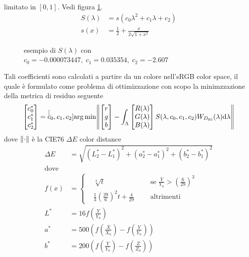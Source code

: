 limitato in $[0,1]$. Vedi figura \ref{chapter2:colorimetry:Slambda}.
\begin{align}\label{chapter2:colorimetry:rgb2spec}
	S(\lambda) &= s(c_0\lambda^2 + c_1\lambda + c_2)\\
	s(x) &= \frac{1}{2} + \frac{x}{2\sqrt{1+x^2}}
\end{align}
\begin{figure}[tb]
	\caption{esempio di $S(\lambda)$ con $c_0 = -0.000073447,\;c_1 = 0.035354,\;c_2 = -2.607$}
	\label{chapter2:colorimetry:Slambda}
\end{figure}
Tali coefficienti sono calcolati a partire da un colore nell'sRGB color space, il quale \`e formulato come problema di ottimizzazione con scopo la
minimzzazione della metrica di residuo seguente
\begin{equation}\label{chapter2:colorimetry:rgb2specResidual}
	\begin{bmatrix}
		c_0^* \\ c_1^* \\ c_2^*
	\end{bmatrix}
	= \;\stackrel[c_0,c_1,c_2]{}{\mathrm{arg}\,\mathrm{min}}\norm{
		\begin{bmatrix}
			r \\ g \\ b
		\end{bmatrix}
		- \int_\Lambda 
		\begin{bmatrix}
			R(\lambda) \\ G(\lambda) \\ B(\lambda)
		\end{bmatrix}
		S(\lambda, c_0, c_1, c_2) W_{D_{65}}(\lambda)\mathrm{d}\lambda
	}
\end{equation}
dove $\norm{\cdot}$ \`e la CIE76 $\Delta E$ color distance\footnotemark{}
\begin{align*}
	\Delta E &= \sqrt{(L^*_2 - L^*_1)^2+(a^*_2 - a^*_1)^2+(b^*_2 - b^*_1)^2}\\
	\text{dove}\\
	f(x)  &= \left\{\begin{alignedat}{3}
			&\sqrt[3]{t} &\,&\text{se }\frac{Y}{Y_n}>\left(\frac{6}{29}\right)^3 \\
			&\frac{1}{3}\left(\frac{29}{6}\right)^2t+\frac{4}{29} \;\;&\,&\text{altrimenti}
		\end{alignedat}\right.\\
	L^* &= 16f\left(\frac{Y}{Y_n}\right)\\
	a^* &= 500\left(f\left(\frac{X}{X_n}\right)-f\left(\frac{Y}{Y_n}\right)\right)\\
	b^* &= 200\left(f\left(\frac{Y}{Y_n}\right)-f\left(\frac{Z}{Z_n}\right)\right)\\
\end{align*}
